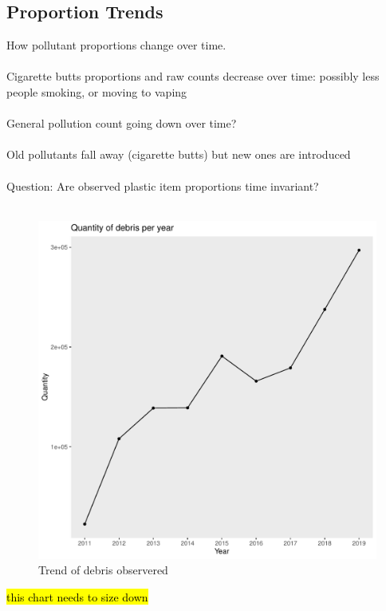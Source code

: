 \documentclass[10pt]{article}\usepackage[]{graphicx}\usepackage[]{color}
\makeatletter
\def\maxwidth{ %
  \ifdim\Gin@nat@width>\linewidth
    \linewidth
  \else
    \Gin@nat@width
  \fi
}
\newenvironment{knitrout}{}{} %
\makeatother
\begin{document}
\subsection{Proportion Trends}
How pollutant proportions change over time.\\
\\
Cigarette butts proportions and raw counts decrease over time: possibly less people smoking, or moving to vaping\\
\\
General pollution count going down over time?\\
\\
Old pollutants fall away (cigarette butts) but new ones are introduced\\
\\
Question: Are observed plastic item proportions time invariant?\\
\\
\begin{figure}[H] %
\begin{center}
\begin{knitrout}
\color{fgcolor}
\includegraphics[width=\maxwidth]{figure/unnamed-chunk-9-1} 

\end{knitrout}
\caption {Trend of debris observered}
\label{figD}
\end {center}
\end {figure}
\hl{this chart needs to size down}
\end{document}
